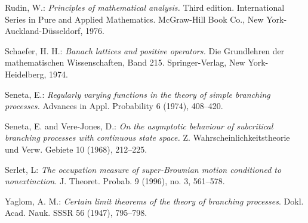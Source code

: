 \documentclass[12pt,a4paper]{amsart}
\numberwithin{equation}{section}
\theoremstyle{plain}
\theoremstyle{definition}
\theoremstyle{remark}
\begin{document}
\begin{thebibliography}{99}
	Rudin, W.:
	\emph{Principles of mathematical analysis.}
	Third edition. International Series in Pure and Applied Mathematics. McGraw-Hill Book Co., New York-Auckland-D\"usseldorf, 1976.

	Schaefer, H. H.:
	\emph{Banach lattices and positive operators.}
	Die Grundlehren der mathematischen Wissenschaften, Band 215. Springer-Verlag, New York-Heidelberg, 1974.
	
	Seneta, E.:
	\emph{Regularly varying functions in the theory of simple branching processes.}
	Advances in Appl. Probability 6 (1974),
	408--420.
	
Seneta, E. and Vere-Jones, D.:
	\emph{On the asymptotic behaviour of subcritical branching processes with continuous state space.}
	Z. Wahrscheinlichkeitstheorie und Verw. Gebiete 10 (1968),
	212--225.
	
	Serlet, L:
	\emph{The occupation measure of super-Brownian motion conditioned to nonextinction.}
	J. Theoret. Probab. 9 (1996), no. 3,
	561--578.

	Yaglom, A. M.: \emph{Certain limit theorems of the theory of branching processes}. Dokl. Acad.
	Nauk. SSSR 56 (1947), 795--798.

\end{thebibliography}
\end{document}
